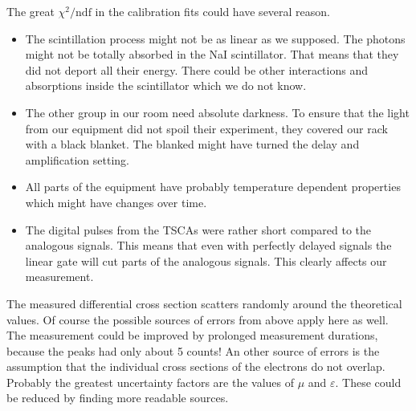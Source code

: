 The great $\chi^2/\mathrm{ndf}$ in the calibration fits could have
several reason.
\begin{itemize}
  \item The scintillation process might not be as linear as we supposed.
  The photons might not be totally absorbed in the NaI scintillator. That
  means that they did not deport all their energy. There could be other
  interactions and absorptions inside the scintillator which we do not know.
  
  \item The other group in our room need absolute darkness. To ensure that
  the light from our equipment did not spoil their experiment, they covered
  our rack with a black blanket. The blanked might have turned the delay and
  amplification setting.

  \item All parts of the equipment have probably temperature dependent
  properties which might have changes over time.

  \item The digital pulses from the TSCAs were rather short compared to the
  analogous signals. This means that even with perfectly delayed signals the
  linear gate will cut parts of the analogous signals. This clearly affects
  our measurement.
\end{itemize}

The measured differential cross section scatters randomly around the
theoretical values. Of course the possible sources of errors from above apply here as
well. The measurement could be improved by prolonged
measurement durations, because the peaks had only about 5 counts!
An other source of errors is the assumption that the individual cross
sections of the electrons do not overlap. Probably the greatest uncertainty
factors are the values of $\mu$ and $\varepsilon$. These could be reduced by
finding more readable sources.

